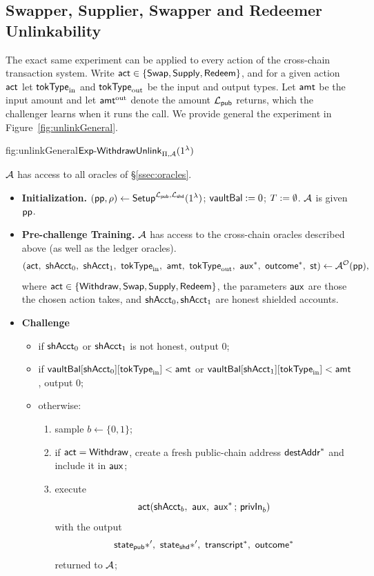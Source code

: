 \subsection{ Swapper, Supplier, Swapper and Redeemer Unlinkability}
\label{sssec:lendgame}
The exact same experiment can be applied to every action of the  cross-chain transaction system.
Write $\mathsf{act} \in \{\mathsf{Swap}, \mathsf{Supply}, \mathsf{Redeem}\}$, and for a given action $\mathsf{act}$ let $\mathsf{tokType}_{\mathrm{in}}$ and $\mathsf{tokType}_{\mathrm{out}}$ be the input and output types.
 Let $\mathsf{amt}$ be the input amount and let
$\mathsf{amt}^{\mathrm{out}}$ denote the amount $\mathcal{L}_{\mathsf{pub}}$ returns, which the challenger learns when it runs the call.
We provide general  the experiment in Figure~\ref{fig:unlinkGeneral}.


\begin{ExpFig}{fig:unlinkGeneral}{$\mathsf{Exp\text{-}WithdrawUnlink}_{\Pi,\mathcal{A}}(1^{\lambda})$}

\vspace{10pt}
$\mathcal{A}$ has access to all oracles of \S\ref{ssec:oracles}.

\begin{itemize}[leftmargin=1.4em,itemsep=3pt]
\item \textbf{Initialization.} $(\mathsf{pp},\rho) \gets \mathsf{Setup}^{\mathcal{L}_{\mathsf{pub}},\mathcal{L}_{\mathsf{shd}}}(1^{\lambda})$;
      $\mathsf{vaultBal} := 0$; $T := \emptyset$. $\mathcal{A}$ is given $\mathsf{pp}$.
\item \textbf{Pre-challenge Training.} $\mathcal{A}$ has access to the cross-chain oracles described above
      (as well as the ledger oracles).
      \[(\act\bc \candZero\bc \candOne\bc \tokTypeIn\bc \amt\bc \tokTypeOut\bc\auxx^*\bc \outc^*\bc
      \mathsf{st}) \gets \Adv^{\mathcal{O}}(\pp),\]
      where $\mathsf{act} \in \{\mathsf{Withdraw}, \mathsf{Swap}, \mathsf{Supply}, \mathsf{Redeem}\}$, the parameters $\mathsf{aux}$ are
      those the chosen action takes, and $\mathsf{shAcct}_0, \mathsf{shAcct}_1$ are honest shielded accounts.

\item \textbf{Challenge}
  \begin{itemize}[nosep,leftmargin=1.4em]
  \item if $\mathsf{shAcct}_0$ or $\mathsf{shAcct}_1$ is not honest, output $0$;
  \item if $\mathsf{vaultBal}[\mathsf{shAcct}_0][\mathsf{tokType}_{\mathrm{in}}] < \mathsf{amt}$ or $\mathsf{vaultBal}[\mathsf{shAcct}_1][\mathsf{tokType}_{\mathrm{in}}] < \mathsf{amt}$, output $0$;
  \item otherwise:
  \begin{enumerate}
      \item sample $b \gets \{0,1\}$;
      \item if $\mathsf{act} = \mathsf{Withdraw}$, create a fresh public-chain address $\mathsf{destAddr}^*$ and
            include it in $\mathsf{aux}$;
      \item execute $$\act(\candB\bc \parm\bc \auxx^* \,;\, \privIn_b)$$
            with the output $$\mathsf{state}_{\mathsf{pub}}*',\ \mathsf{state}_{\mathsf{shd}}*',\ \mathsf{transcript}^*,\ \mathsf{outcome}^*$$ returned to $\mathcal{A}$;


\end{enumerate}
\end{itemize}
\end{itemize}
\end{ExpFig}
